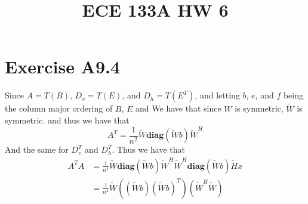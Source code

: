 
\title{ECE 133A HW 6}

\maketitle
\section*{Exercise A9.4}
Since $A=T(B)$, $D_v=T(E)$, and $D_h=T(E^T)$, and letting
$b$, $e$, and $f$ being the column major ordering of $B$, $E$ and  
We have that since $W$ is symmetric, $\tilde{W}$ is symmetric. and thus we have that 
$$A^T=\frac{1}{n^2}\tilde{W}\textbf{diag}(\tilde{W}b)\tilde{W}^H$$
And the same for $D_v^T$ and $D_h^T$. Thus we have that
\begin{align*}
    A^TA&=\frac{1}{n^4}\tilde{W}\textbf{diag}(\tilde{W}b)\tilde{W}^H\tilde{W}^H\textbf{diag}(\tilde{W}b)\tilde{H}x\\
    &=\frac{1}{n^4}\tilde{W}\left(\left(\tilde{W}b\right)\left(\tilde{W}b\right)^T\right)\left(\tilde{W}^H\tilde{W}\right)
\end{align*}

